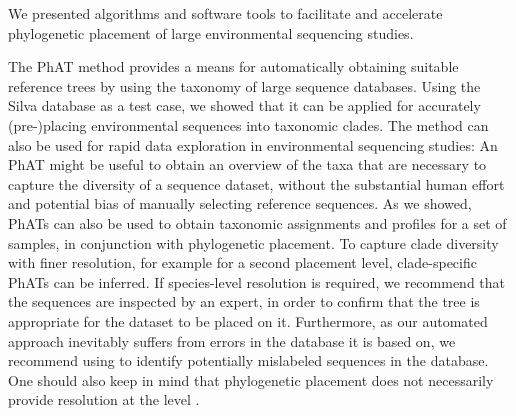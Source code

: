We presented algorithms and software tools to facilitate and accelerate
phylogenetic placement of large environmental sequencing studies. %

The \acf{PhAT} method provides a means for automatically obtaining suitable reference trees
by using the taxonomy of large sequence databases.
Using the Silva database as a test case,
we showed that it can be applied for accurately (pre-)placing environmental sequences into taxonomic clades.
The method can also be used for rapid data exploration in environmental sequencing studies:
An \ac{PhAT} might be useful to obtain an overview of the taxa that are necessary to capture the diversity of a sequence dataset,
without the substantial human effort and potential bias of manually selecting reference sequences.
As we showed, \acp{PhAT} can also be used to obtain taxonomic assignments and profiles for a set of samples,
in conjunction with phylogenetic placement.
To capture clade diversity with finer resolution, for example for a second placement level,
clade-specific \acp{PhAT} can be inferred.
If species-level resolution is required, we recommend that the sequences are inspected by an expert,
in order to confirm that the tree is appropriate for the dataset to be placed on it.
Furthermore, as our automated approach inevitably suffers from errors in the database it is based on,
we recommend using  \citep{Kozlov2016}
to identify potentially mislabeled sequences in the database.
One should also keep in mind that phylogenetic placement
does not necessarily provide resolution at the  level \citep{Dunthorn2014}.

